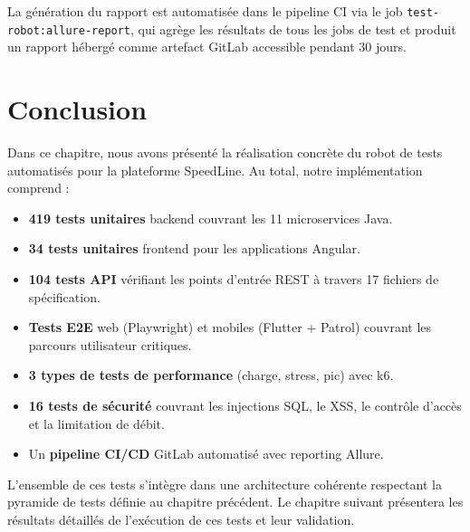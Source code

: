 La génération du rapport est automatisée dans le pipeline CI via le job
\texttt{test-robot:allure-report}, qui agrège les résultats de tous les jobs de test
et produit un rapport hébergé comme artefact GitLab accessible pendant 30 jours.

\section*{Conclusion}

Dans ce chapitre, nous avons présenté la réalisation concrète du robot de tests
automatisés pour la plateforme SpeedLine. Au total, notre implémentation comprend :

\begin{itemize}
  \item \textbf{419 tests unitaires} backend couvrant les 11 microservices Java.
  \item \textbf{34 tests unitaires} frontend pour les applications Angular.
  \item \textbf{104 tests API} vérifiant les points d'entrée REST à travers 17
        fichiers de spécification.
  \item \textbf{Tests E2E} web (Playwright) et mobiles (Flutter + Patrol) couvrant
        les parcours utilisateur critiques.
  \item \textbf{3 types de tests de performance} (charge, stress, pic) avec k6.
  \item \textbf{16 tests de sécurité} couvrant les injections SQL, le XSS, le
        contrôle d'accès et la limitation de débit.
  \item Un \textbf{pipeline CI/CD} GitLab automatisé avec reporting Allure.
\end{itemize}

L'ensemble de ces tests s'intègre dans une architecture cohérente respectant la
pyramide de tests définie au chapitre précédent. Le chapitre suivant présentera
les résultats détaillés de l'exécution de ces tests et leur validation.
